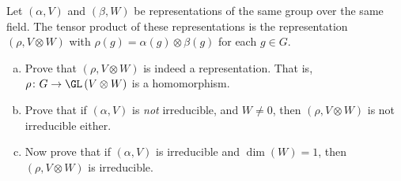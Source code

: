 \documentclass[10pt]{mypackage}
\begin{document}
%
%
\begin{problem}[Problem 7]
  Let $\left( \alpha,V \right)$ and $\left( \beta,W \right)$ be representations of the same group over the same field. The tensor product of these representations is the representation $\left( \rho,V\otimes W \right)$ with $\rho(g) = \alpha(g)\otimes \beta(g)$ for each $g\in G$.
  \begin{enumerate}[(a)]
    \item Prove that $\left( \rho,V\otimes W \right)$ is indeed a representation. That is, $\rho\colon G\rightarrow \GL\left( V\otimes W \right)$ is a homomorphism.
    \item Prove that if $\left( \alpha,V \right)$ is \textit{not} irreducible, and $W\neq 0$, then $\left( \rho,V\otimes W \right)$ is not irreducible either.
    \item Now prove that if $\left( \alpha,V \right)$ is irreducible and $\operatorname{dim}\left( W \right) = 1$, then $\left( \rho,V\otimes W \right)$ is irreducible.
  \end{enumerate}
\end{problem}
\end{document}
